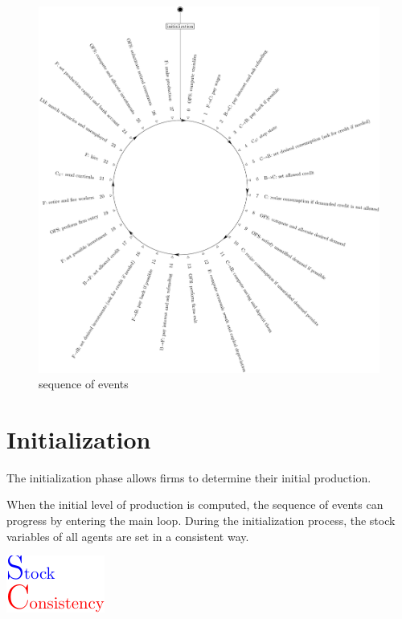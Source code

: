 \documentclass{book}
\begin{document}
\begin{figure}[htp]
	\centering
\includegraphics[scale=0.5]{visual.pdf}
	\caption{sequence of events}
	\label{fig:sequence}
\end{figure}

\clearpage
\section{Initialization}\label{sec:initialization}
The initialization phase allows firms to determine their initial production. %

When the initial level of production is computed, the sequence of events can progress by entering the main loop. During the initialization process, the stock variables of all agents are set in a consistent way.\begin{marginfigure}
	\hskip1cm\includegraphics[scale=1.0]{sc_logo-0.pdf}
\end{marginfigure}
\end{document}

